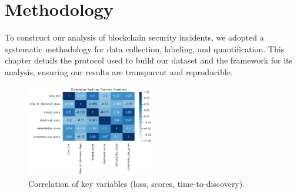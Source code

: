 \section{Methodology}
\label{sec:methodology}

To construct our analysis of blockchain security incidents, we adopted a systematic methodology for data collection, labeling, and quantification. This chapter details the protocol used to build our dataset and the framework for its analysis, ensuring our results are transparent and reproducible.

\begin{figure}[H]
\centering
\includegraphics[width=0.5\textwidth]{../figure/Figure/figures_2/G1_correlation_heatmap.png}
\caption{Correlation of key variables (loss, scores, time-to-discovery).}
\label{fig:five_layer_architecture}
\end{figure}







